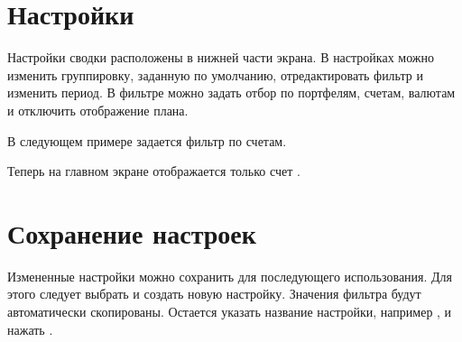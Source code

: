 \documentclass[a4paper,10pt,russian]{sphinxmanual}
\begin{document}
\noindent{}


\section{Настройки}
\label{\detokenize{main-screen:id4}}
Настройки сводки расположены в нижней части экрана. В настройках можно изменить группировку, заданную по умолчанию,
отредактировать фильтр и изменить период. В фильтре можно задать отбор по портфелям, счетам, валютам и отключить
отображение плана.

В следующем примере задается фильтр по счетам.

\noindent{}

\noindent{}

\noindent{}

\noindent{}

\noindent{}

\noindent{}

Теперь на главном экране отображается только счет .


\section{Сохранение настроек}
\label{\detokenize{main-screen:id5}}
Измененные настройки можно сохранить для последующего использования. Для этого следует выбрать
 и создать новую настройку. Значения фильтра будут автоматически
скопированы. Остается указать название настройки, например , и
нажать .

\noindent{}

\noindent{}
\end{document}

